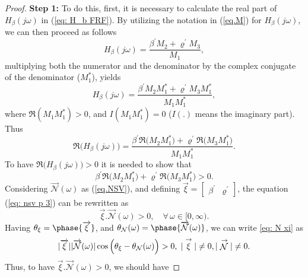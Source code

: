 \begin{proof}
\textbf{Step 1:}
To do this, first, it is necessary to calculate the real part of $H_\beta(j\omega)$ in (\ref{eq: H_b FRF}). By utilizing the notation in (\ref{eq.M}) for $H_\beta(j\omega)$, we can then proceed as follows
\begin{equation}
    \label{eq: nsv p 1}
    H_\beta(j\omega)=\frac{\beta^{'}M_2+\varrho^{'}M_3}{M_1},
\end{equation}
multiplying both the numerator and the denominator by the complex conjugate of the denominator ($M_1^{*}$), yields
\begin{equation}
    \label{eq: nsv p 2}
    H_\beta(j\omega)=\frac{\beta^{'}M_2M_1^{*}+\varrho^{'}M_3M_1^{*}}{M_1M_1^{*}},
\end{equation}
where $\mathfrak{R}(M_1M_1^{*})>0$, and $I(M_1M_1^{*})=0$ ($I(.)$ means the imaginary part). Thus 
\begin{equation}
    \label{eq: nsv p 25}
\mathfrak{R}\Big(H_\beta(j\omega)\Big)=\frac{\beta^{'}\mathfrak{R}\Big(M_2M_1^{*}\Big)+\varrho^{'}\mathfrak{R}\Big(M_3M_1^{*}\Big)}{M_1M_1^{*}}.
\end{equation}
To have $\mathfrak{R}\Big(H_\beta(j\omega)\Big)>0$ it is needed to show that 
\begin{equation}
    \label{eq: nsv p 3}
\beta^{'}\mathfrak{R}\Big(M_2M_1^{*}\Big)+\varrho^{'}\mathfrak{R}\Big(M_3M_1^{*}\Big)>0.
\end{equation}
Considering $\overrightarrow{\mathcal{N}}(\omega)$ as (\ref{eq.NSV}), and defining $\overrightarrow{\xi}=\begin{bmatrix}
    \beta^{'} & \varrho^{'}
\end{bmatrix}$, the equation (\ref{eq: nsv p 3}) can be rewritten as
\begin{equation}
    \label{eq: N xi}
    \overrightarrow{\xi}.\overrightarrow{\mathcal{N}}(\omega)>0, \quad \forall \, \omega \in [0,\infty).
\end{equation}
Having $\theta_{\xi}=\phase{\overrightarrow{\xi}}$, and $\theta_{\mathcal{N}}(\omega)=\phase{\overrightarrow{\mathcal{N}}(\omega)}$, we can write \eqref{eq: N xi} as
\begin{equation}
    \label{eq: N xi 2}
    |\overrightarrow{\xi}||\overrightarrow{\mathcal{N}}(\omega)| \cos{\Big(\theta_{\xi}-\theta_{\mathcal{N}}(\omega)\Big)}>0, \;|\stackrel{\rightarrow}{\xi}|\neq0, |\stackrel{\rightarrow}{\mathcal{N}}|\neq0.\\
\end{equation}
Thus, to have $\overrightarrow{\xi}.\overrightarrow{\mathcal{N}}(\omega)>0$, we should have

\end{proof}
